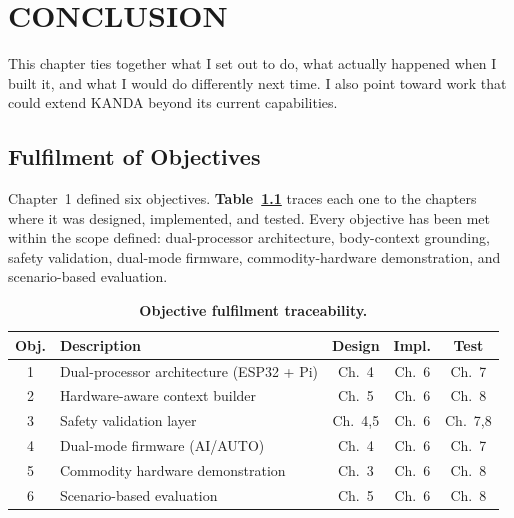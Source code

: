 \chapter{CONCLUSION}
\label{ch:conclusion}

This chapter ties together what I set out to do, what actually happened when I built it, and what I would do differently next time. I also point toward work that could extend KANDA beyond its current capabilities.

\section{Fulfilment of Objectives}
\label{sec:objective_fulfilment}

Chapter~1 defined six objectives. \textbf{Table~\ref{tab:objectives_map}} traces each one to the chapters where it was designed, implemented, and tested. Every objective has been met within the scope defined: dual-processor architecture, body-context grounding, safety validation, dual-mode firmware, commodity-hardware demonstration, and scenario-based evaluation.

\begin{table}[H]
\centering
\caption[Objective fulfilment traceability.]{\textbf{Objective fulfilment traceability.}}
\label{tab:objectives_map}
\renewcommand{\arraystretch}{1.3}
\begin{tabularx}{\textwidth}{|c|X|c|c|c|}
\hline
\textbf{Obj.} & \textbf{Description} & \textbf{Design} & \textbf{Impl.} & \textbf{Test} \\
\hline
1 & Dual-processor architecture (ESP32 + Pi) & Ch.~4 & Ch.~6 & Ch.~7 \\
\hline
2 & Hardware-aware context builder & Ch.~5 & Ch.~6 & Ch.~8 \\
\hline
3 & Safety validation layer & Ch.~4,5 & Ch.~6 & Ch.~7,8 \\
\hline
4 & Dual-mode firmware (AI/AUTO) & Ch.~4 & Ch.~6 & Ch.~7 \\
\hline
5 & Commodity hardware demonstration & Ch.~3 & Ch.~6 & Ch.~8 \\
\hline
6 & Scenario-based evaluation & Ch.~5 & Ch.~6 & Ch.~8 \\
\hline
\end{tabularx}
\end{table}

